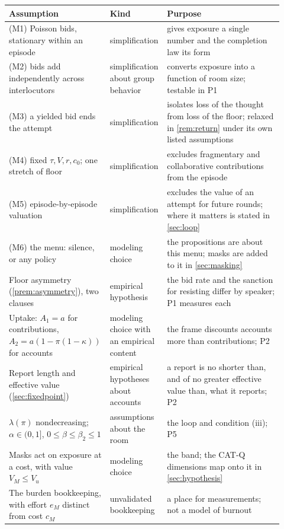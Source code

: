 \begin{center}\small
\begin{tabular}{p{0.3\linewidth} p{0.2\linewidth} p{0.42\linewidth}}
\toprule
Assumption & Kind & Purpose \\
\midrule
(M1) Poisson bids, stationary within an episode & simplification & gives exposure a single number and the completion law its form \\
(M2) bids add independently across interlocutors & simplification about group behavior & converts exposure into a function of room size; testable in P1 \\
(M3) a yielded bid ends the attempt & simplification & isolates loss of the thought from loss of the floor; relaxed in \autoref{rem:return} under its own listed assumptions \\
(M4) fixed $\tau, V, r, c_0$; one stretch of floor & simplification & excludes fragmentary and collaborative contributions from the episode \\
(M5) episode-by-episode valuation & simplification & excludes the value of an attempt for future rounds; where it matters is stated in \autoref{sec:loop} \\
(M6) the menu: silence, or any policy & modeling choice & the propositions are about this menu; masks are added to it in \autoref{sec:masking} \\
Floor asymmetry (\autoref{prem:asymmetry}), two clauses & empirical hypothesis & the bid rate and the sanction for resisting differ by speaker; P1 measures each \\
Uptake: $A_1 = a$ for contributions, $A_2 = a(1-\pi(1-\kappa))$ for accounts & modeling choice with an empirical content & the frame discounts accounts more than contributions; P2 \\
Report length and effective value (\autoref{sec:fixedpoint}) & empirical hypotheses about accounts & a report is no shorter than, and of no greater effective value than, what it reports; P2 \\
$\lambda(\pi)$ nondecreasing; $\alpha \in (0,1]$, $0 \le \beta \le \beta_2 \le 1$ & assumptions about the room & the loop and condition (iii); P5 \\
Masks act on exposure at a cost, with value $V_M \le V_u$ & modeling choice & the band; the CAT-Q dimensions map onto it in \autoref{sec:hypothesis} \\
The burden bookkeeping, with effort $e_M$ distinct from cost $c_M$ & unvalidated bookkeeping & a place for measurements; not a model of burnout \\

\end{tabular}
\end{center}
